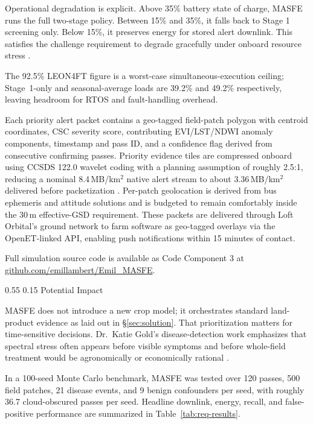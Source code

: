 \documentclass[11pt,letterpaper]{article}
\makeatletter
\renewcommand\section{\@startsection{section}{1}{\z@}
  {0.55\baselineskip}
  {0.15\baselineskip}
  {\normalfont\large\bfseries}}
\newcommand{\masferepo}{https://github.com/emillambert/Emil_MASFE}
\makeatother
\begin{document}
Operational degradation is explicit. Above 35\% battery state of charge, MASFE runs the full two-stage policy. Between 15\% and 35\%, it falls back to Stage 1 screening only. Below 15\%, it preserves energy for stored alert downlink. This satisfies the challenge requirement to degrade gracefully under onboard resource stress \cite{nasa-challenge-brief}.

The 92.5\% LEON4FT figure is a worst-case simultaneous-execution ceiling; Stage~1-only and seasonal-average loads are 39.2\% and 49.2\% respectively, leaving headroom for RTOS and fault-handling overhead.

Each priority alert packet contains a geo-tagged field-patch polygon with centroid coordinates, CSC severity score, contributing EVI/LST/NDWI anomaly components, timestamp and pass ID, and a confidence flag derived from consecutive confirming passes. Priority evidence tiles are compressed onboard using CCSDS 122.0 wavelet coding with a planning assumption of roughly 2.5:1, reducing a nominal 8.4\,MB/km$^2$ native alert stream to about 3.36\,MB/km$^2$ delivered before packetization \cite{esa-cwicom}. Per-patch geolocation is derived from bus ephemeris and attitude solutions and is budgeted to remain comfortably inside the 30\,m effective-GSD requirement. These packets are delivered through Loft Orbital's ground network to farm software as geo-tagged overlays via the OpenET-linked API, enabling push notifications within 15 minutes of contact.

Full simulation source code is available as Code Component 3 at \href{\masferepo}{github.com/emillambert/Emil\_MASFE}.

\section{Potential Impact}
\label{sec:impact}

MASFE does not introduce a new crop model; it orchestrates standard land-product evidence as laid out in \S\ref{sec:solution}. That prioritization matters for time-sensitive decisions. Dr.\ Katie Gold's disease-detection work emphasizes that spectral stress often appears before visible symptoms and before whole-field treatment would be agronomically or economically rational \cite{gold-webinar1}.

In a 100-seed Monte Carlo benchmark, MASFE was tested over 120 passes, 500 field patches, 21 disease events, and 9 benign confounders per seed, with roughly 36.7 cloud-obscured passes per seed. Headline downlink, energy, recall, and false-positive performance are summarized in Table~\ref{tab:req-results}.
\end{document}
